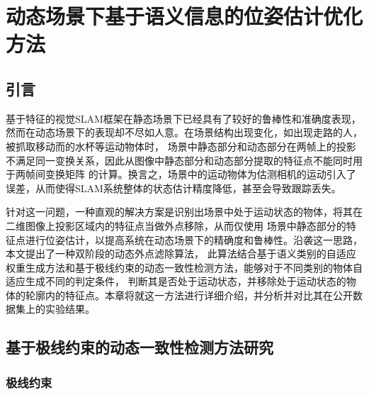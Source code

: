\chapter{动态场景下基于语义信息的位姿估计优化方法}\label{chap:3}
\section{引言}
基于特征的视觉SLAM框架在静态场景下已经具有了较好的鲁棒性和准确度表现，然而在动态场景下的表现却不尽如人意。在场景结构出现变化，如出现走路的人，被抓取移动而的水杯等运动物体时，
场景中静态部分和动态部分在两帧上的投影不满足同一变换关系，因此从图像中静态部分和动态部分提取的特征点不能同时用于两帧间变换矩阵
的计算。换言之，场景中的运动物体为估测相机的运动引入了误差，从而使得SLAM系统整体的状态估计精度降低，甚至会导致跟踪丢失。

针对这一问题，一种直观的解决方案是识别出场景中处于运动状态的物体，将其在二维图像上投影区域内的特征点当做外点移除，从而仅使用
场景中静态部分的特征点进行位姿估计，以提高系统在动态场景下的精确度和鲁棒性。沿袭这一思路，本文提出了一种双阶段的动态外点滤除算法，
此算法结合基于语义类别的自适应权重生成方法和基于极线约束的动态一致性检测方法，能够对于不同类别的物体自适应生成不同的判定条件，
判断其是否处于运动状态，并移除处于运动状态的物体的轮廓内的特征点。本章将就这一方法进行详细介绍，并分析并对比其在公开数据集上的实验结果。

\section{基于极线约束的动态一致性检测方法研究}
\subsection{极线约束}


